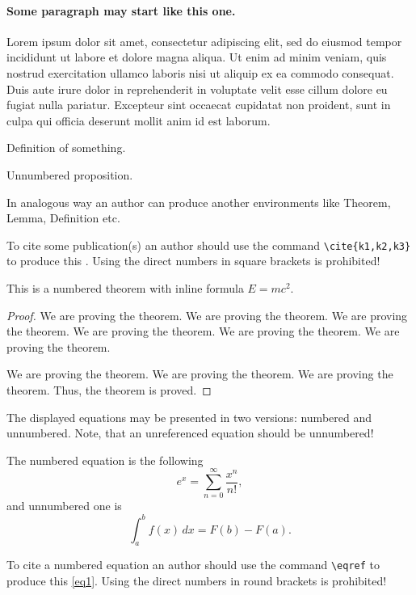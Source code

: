 \documentclass[12pt,twoside,draft]{cmpart}
\begin{document}
\paragraph{Some paragraph may start like this one.}
Lorem ipsum dolor sit amet, consectetur adipiscing elit, sed do eiusmod tempor 
incididunt ut labore et dolore magna aliqua. Ut enim ad minim veniam, 
quis nostrud exercitation ullamco laboris nisi ut aliquip ex ea commodo consequat. 
Duis aute irure dolor in reprehenderit in voluptate velit esse cillum dolore eu fugiat nulla pariatur. 
Excepteur sint occaecat cupidatat non proident, sunt in culpa qui officia deserunt mollit anim id est laborum.

\begin{definition}
Definition of something.
\end{definition}

\begin{proposition*}
Unnumbered proposition.
\end{proposition*}

In analogous way an author can produce another environments like
Theorem, Lemma, Definition etc.

To cite some publication(s) an author should use the command 
\verb"\cite{k1,k2,k3}" to produce this \cite{k1,k2,k3}.
Using the direct numbers in square brackets is prohibited!

\begin{theorem}
This is a numbered theorem with inline formula $E=mc^2$.
\end{theorem}
\begin{proof}
We are proving the theorem. We are proving the theorem. We are proving the theorem.
We are proving the theorem. We are proving the theorem. We are proving the theorem.

We are proving the theorem. We are proving the theorem. We are proving the theorem. 
Thus, the theorem is proved. 
\end{proof}

The displayed equations may be presented in two versions: numbered and unnumbered.
Note, that an unreferenced equation should be unnumbered!

The numbered equation is the following
\begin{equation}\label{eq1}
 e^x=\sum_{n=0}^\infty \frac{x^n}{n!},
\end{equation}
and unnumbered one is
\[
 \int_a^b f(x)\,dx=F(b)-F(a).
\]

To cite a numbered equation an author should use the command \verb"\eqref" to 
produce this \eqref{eq1}. Using the direct numbers in round brackets is prohibited!
\end{document}
